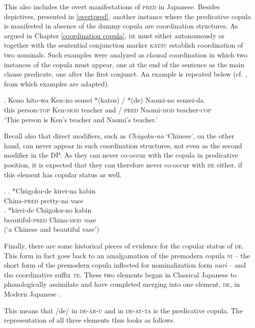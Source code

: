 \documentclass [output=book,colorlinks,citecolor=brown]{langscibook}
\begin{document}
This also includes the overt manifestations of \textsc{pred} in Japanese. Besides depictives, presented in \ref{overtpred}, another instance where the predicative copula is manifested in absence of the dummy copula are coordination structures. As argued in Chapter \ref{coordination copula}, \textsc{de} must either autonomously or together with the sentential conjunction marker \textsc{katsu} establish coordination of two nominals. Such examples were analyzed as clausal coordination in which two instances of the copula must appear, one at the end of the sentence as the main clause predicate, one after the first conjunct. An example is repeated below (cf. \citealt[364]{hiraiwa:2012:mechanism}, from which examples are adapted). %

\exg. Kono hito-wa Ken-no sensei *(katsu) / *(de) Naomi-no sensei-da.\\
this person-\textsc{top} Ken-\textsc{mod} teacher and / \textsc{pred} Naomi-\textsc{mod} teacher-\textsc{cop}\\
`This person is Ken's teacher and Naomi's teacher.’

Recall also that direct modifiers, such as \textit{Chūgoku-no} `Chinese’, on the other hand, can never appear in such coordination structures, not even as the second modifier in the DP. As they can never co-occur with the copula in predicative position, it is expected that they can therefore never co-occur with \textsc{de} either, if this element has copular status as well.

\ex. \ag. *Chūgoku-de kirei-na kabin\\
China-\textsc{pred} pretty-na vase\\
\bg. *kirei-de Chūgoku-no 	kabin\\
beautiful-\textsc{pred} China-\textsc{mod} vase\\
(`a Chinese and beautiful vase’)

Finally, there are some historical pieces of evidence for the copular status of \textsc{de}. This form in fact goes back to an amalgamation of the premodern copula \textsc{ni} -- the short form of the premodern copula inflected for nominalization form \textit{nari} -- and the coordinative suffix \textsc{te}. These two elements began in Classical Japanese to phonologically assimilate and have completed merging into one element, \textsc{de}, in Modern Japanese \citep{frellesvig:2010:history, miyama:2011:da}. %

This means that /de/ in \textsc{de-ar-u} and in \textsc{de-at-ta} is the predicative copula. The representation of all three elements thus looks as follows.
\end{document}
